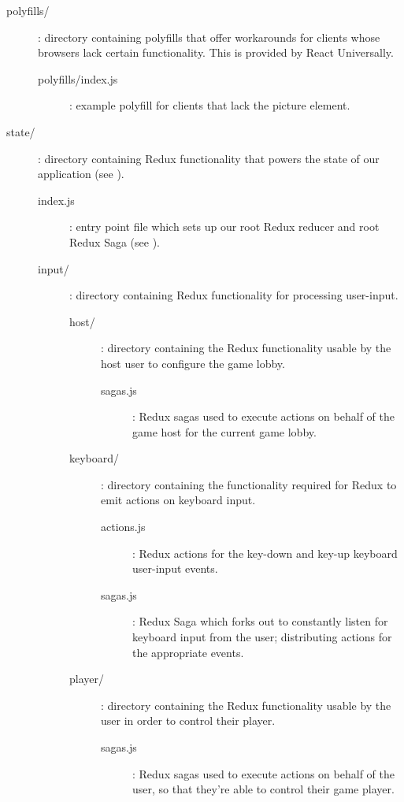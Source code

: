 \documentclass{standalone}
\begin{document}
\begin{formal}
\begin{description}
\begin{description}
\begin{description}
		        	\item[polyfills/]: directory containing polyfills that offer workarounds for clients whose browsers lack certain functionality. This is provided by React Universally.
		      		\begin{description}
		        		\item[polyfills/index.js]: example polyfill for clients that lack the picture element.
	        		\end{description}

		        	\item[state/]: directory containing Redux functionality that powers the state of our application (see ).
		      		\begin{description}
			        	\item[index.js]: entry point file which sets up our root Redux reducer and root Redux Saga (see ).

			        	\item[input/]: directory containing Redux functionality for processing user-input.
		      			\begin{description}
				        	\item[host/]: directory containing the Redux functionality usable by the host user to configure the game lobby.
		      				\begin{description}
				        		\item[sagas.js]: Redux sagas used to execute actions on behalf of the game host for the current game lobby.
		      				\end{description}

				        	\item[keyboard/]: directory containing the functionality required for Redux to emit actions on keyboard input.
		      				\begin{description}
				        		\item[actions.js]: Redux actions for the key-down and key-up keyboard user-input events.
				        		\item[sagas.js]: Redux Saga which forks out to constantly listen for keyboard input from the user; distributing actions for the appropriate events.
		      				\end{description}

		      				\item[player/]: directory containing the Redux functionality usable by the user in order to control their player.
		      				\begin{description}
				        		\item[sagas.js]: Redux sagas used to execute actions on behalf of the user, so that they're able to control their game player.
		      				\end{description}
		      			\end{description}


\end{description}
\end{description}
\end{description}
\end{description}
\end{formal}
\end{document}
